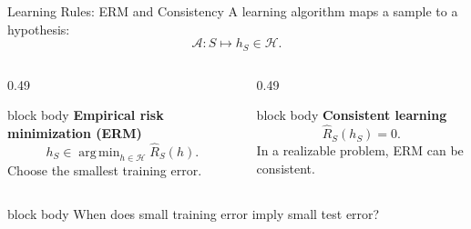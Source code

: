\documentclass[aspectratio=169,10pt]{beamer}
\DeclareMathOperator*{\argmin}{arg\,min}
\newcommand{\Hc}{\mathcal{H}}
\newcommand{\Aalg}{\mathcal{A}}
\begin{document}
\begin{frame}[t]{Learning Rules: ERM and Consistency}
  \vspace{0.06cm}
  A learning algorithm maps a sample to a hypothesis:
  \[
    \Aalg:S\longmapsto h_S\in\Hc.
  \]
  \vspace{-0.18cm}
  \begin{columns}[T,totalwidth=\textwidth]
    \begin{column}{0.49\textwidth}
      \begin{beamercolorbox}[rounded=true,sep=0.18cm,wd=\linewidth]{block body}
        \textbf{Empirical risk minimization (ERM)}
        \[
          h_S\in\argmin_{h\in\Hc}\widehat R_S(h).
        \]
        Choose the smallest training error.
      \end{beamercolorbox}
    \end{column}
    \begin{column}{0.49\textwidth}
      \begin{beamercolorbox}[rounded=true,sep=0.18cm,wd=\linewidth]{block body}
        \textbf{Consistent learning}
        \[
          \widehat R_S(h_S)=0.
        \]
        In a realizable problem, ERM can be consistent.
      \end{beamercolorbox}
    \end{column}
  \end{columns}
  \vspace{0.04cm}
  \begin{beamercolorbox}[rounded=true,sep=0.08cm,wd=0.92\linewidth,center]{block body}
    When does small training error imply small test error?
  \end{beamercolorbox}
\end{frame}
\end{document}
